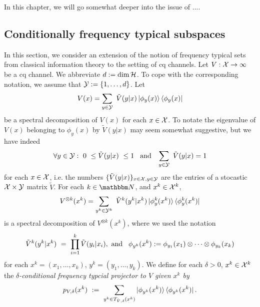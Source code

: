 In this chapter, we will go somewhat deeper into the issue of ....

 
     \subsection{Conditionally frequency typical subspaces}
      In this section, we consider an extension of the notion of frequency typical sets from classical information theory to the setting of cq channels. Let $V: {\mathcal X} \rightarrow \infty$ be a cq channel. We 
      abbreviate $d:= \dim {\mathcal H}$. To cope with the corresponding notation, we assume that ${\mathcal Y} := \{1,\dots, d\}$. Let 
      \begin{align}
       V(x) = \sum_{y \in {\mathcal Y}} \ \tilde{V}(y|x) \ket{\phi_y(x)} \bra{\phi_y(x)}
      \end{align}
       be a spectral decomposition of $V(x)$ for each $x \in {\mathcal X}$. To notate the eigenvalue of $V(x)$ belonging to $\phi_y(x)$ by $\tilde{V}(y|x)$ may seem somewhat suggestive, but we have indeed 
       \begin{align}
         \forall y \in \cY:  \ 0 \ \leq \tilde{V}(y|x) \ \leq 1  \hspace{.3cm} \text{and} \hspace{.3cm} \sum_{y \in \cY} \ \tilde{V}(y|x) = 1
       \end{align} 
      for each $x \in {\mathcal X}$, i.e. the numbers $\{\tilde{V}(y|x) \}_{x \in {\mathcal X}, y \in {\mathcal Y}}$ are the entries of a stocastic ${\mathcal X} \times {\mathcal Y}$ matrix $\tilde{V}$. For each $k \in \bbmN$, and $x^k \in {\mathcal X}^k$, 
      \begin{align}
       V^{\otimes k}(x^k) = \sum_{y^k \in {\mathcal Y}^k} \ \tilde{V}^k(y^k|x^k) \ket{\phi_y^k(x^k)} \bra{\phi_y^k(x^k)}
      \end{align}
       is a spectral decomposition of $V^{\otimes k}(x^k)$, where we used the notation
       \begin{align}
        \tilde{V}^{k}(y^k|x^k) \ = \ \prod_{i=1}^k \tilde{V}(y_i|x_i), \ \text{and} \hspace{.3cm} \phi_{y^k}(x^k) := \phi_{y_1}(x_1) \otimes \cdots \otimes \phi_{y_k}(x_k)
       \end{align}
       for each $x^k = (x_1,\dots,x_k)$, $y^k = (y_1, \dots, y_k)$. We define for each $\delta > 0$, $x^k \in {\mathcal X}^k$ the \emph{$\delta$-conditional frequency typcial projector to $V$ given $x^k$ by}
       \begin{align}
        p_{V,\delta}(x^k) \ := \ \sum_{y^k \in T_{\tilde{V},\delta}(x^k)} \ket{\phi_{y^k}(x^k)} \bra{\phi_{y^k}(x^k)}.
       \end{align}
